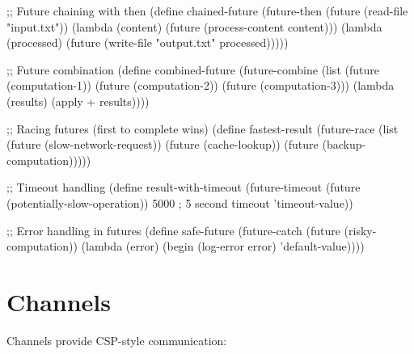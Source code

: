 \begin{example}
\begin{lambdustcode}
;; Future chaining with then
(define chained-future
  (future-then 
    (future (read-file "input.txt"))
    (lambda (content) 
      (future (process-content content)))
    (lambda (processed)
      (future (write-file "output.txt" processed)))))

;; Future combination  
(define combined-future
  (future-combine
    (list (future (computation-1))
          (future (computation-2))
          (future (computation-3)))
    (lambda (results) 
      (apply + results))))

;; Racing futures (first to complete wins)
(define fastest-result
  (future-race 
    (list (future (slow-network-request))
          (future (cache-lookup))
          (future (backup-computation)))))

;; Timeout handling
(define result-with-timeout
  (future-timeout 
    (future (potentially-slow-operation))
    5000    ; 5 second timeout
    'timeout-value))

;; Error handling in futures
(define safe-future
  (future-catch
    (future (risky-computation))
    (lambda (error)
      (begin 
        (log-error error)
        'default-value))))
\end{lambdustcode}
\end{example}

\section{Channels}
\label{sec:channels}


Channels provide CSP-style communication:

